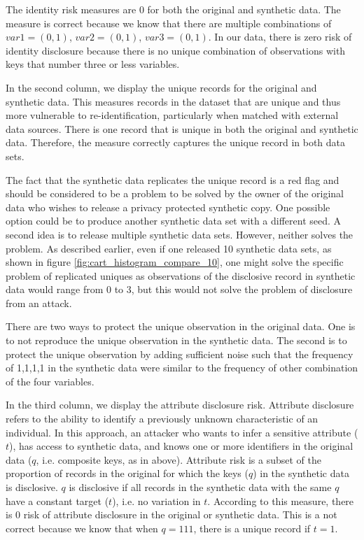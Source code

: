 \documentclass[runningheads]{llncs}
\begin{document}
The identity risk measures are 0 for both the original and synthetic data.  The measure is correct because we know that there are multiple combinations of $var1=(0,1)$, $var2=(0,1)$, $var3=(0,1)$.  In our data, there is zero risk of identity disclosure because there is no unique combination of observations with keys that number three or less variables.

In the second column, we display the unique records for the original and synthetic data.  This measures records in the dataset that are unique and thus more vulnerable to re-identification, particularly when matched with external data sources.  There is one record that is unique in both the original and synthetic data.  Therefore, the measure correctly captures the unique record in both data sets.

The fact that the synthetic data replicates the unique record is a red flag and should be considered to be a problem to be solved by the owner of the original data who wishes to release a privacy protected synthetic copy.  One possible option could be to produce another synthetic data set with a different seed.  A second idea is to release multiple synthetic data sets.  However, neither solves the problem.  As described earlier, even if one released 10 synthetic data sets, as shown in figure \ref{fig:cart_histogram_compare_10}, one might solve the specific problem of replicated uniques as observations of the disclosive record in synthetic data would range from 0 to 3, but this would not solve the problem of disclosure from an attack.  

There are two ways to protect the unique observation in the original data.  One is to not reproduce the unique observation in the synthetic data.  The second is to protect the unique observation by adding sufficient noise such that the frequency of 1,1,1,1 in the synthetic data were similar to the frequency of other combination of the four variables.  

In the third column, we display the attribute disclosure risk.  Attribute disclosure refers to the ability to identify a previously unknown characteristic of an individual.  In this approach, an attacker who wants to infer a sensitive attribute ($t$), has access to synthetic data, and knows one or more identifiers in the original data ($q$, i.e. composite keys, as in above).  Attribute risk is a subset of the proportion of records in the original for which the keys ($q$) in the synthetic data is disclosive. $q$ is disclosive if all records in the synthetic data with the same $q$ have a constant target ($t$), i.e. no variation in $t$.  According to this measure, there is 0 risk of attribute disclosure in the original or synthetic data.  This is a not correct because we know that when $q=111$, there is a unique record if $t=1$.  
\end{document}
